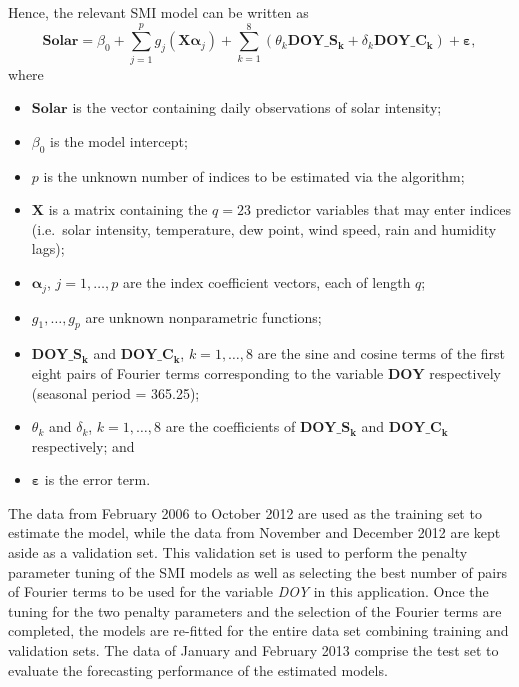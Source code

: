 \documentclass[
  11pt,
  a4paper,
]{article}
\providecommand{\tightlist}{%
  \setlength{\itemsep}{0pt}\setlength{\parskip}{0pt}}\usepackage{longtable,booktabs,array}
\begin{document}
Hence, the relevant SMI model can be written as \[
  \textbf{Solar} = \beta_{0} + \sum_{j = 1}^{p}{g_{j}(\bm{X}\bm{\alpha}_{j})} + \sum_{k = 1}^{8}(\theta_{k}\textbf{DOY}\_\textbf{S}_{\bm{k}} + \delta_{k}\textbf{DOY}\_\textbf{C}_{\bm{k}}) + \bm{\varepsilon},
\] where

\begin{itemize}
\tightlist
\item
  \(\textbf{Solar}\) is the vector containing daily observations of
  solar intensity;
\item
  \(\beta_{0}\) is the model intercept;
\item
  \(p\) is the unknown number of indices to be estimated via the
  algorithm;
\item
  \(\bm{X}\) is a matrix containing the \(q=23\) predictor variables
  that may enter indices (i.e.~solar intensity, temperature, dew point,
  wind speed, rain and humidity lags);
\item
  \(\bm{\alpha}_{j}\), \(j = 1, \dots, p\) are the index coefficient
  vectors, each of length \(q\);
\item
  \(g_{1}, \dots, g_{p}\) are unknown nonparametric functions;
\item
  \(\textbf{DOY}\_\textbf{S}_{\bm{k}}\) and
  \(\textbf{DOY}\_\textbf{C}_{\bm{k}}\), \(k = 1, \dots, 8\) are the
  sine and cosine terms of the first eight pairs of Fourier terms
  corresponding to the variable \(\textbf{DOY}\) respectively (seasonal
  period = 365.25);
\item
  \(\theta_{k}\) and \(\delta_{k}\), \(k = 1, \dots, 8\) are the
  coefficients of \(\textbf{DOY}\_\textbf{S}_{\bm{k}}\) and
  \(\textbf{DOY}\_\textbf{C}_{\bm{k}}\) respectively; and
\item
  \(\bm{\varepsilon}\) is the error term.
\end{itemize}

The data from February 2006 to October 2012 are used as the training set
to estimate the model, while the data from November and December 2012
are kept aside as a validation set. This validation set is used to
perform the penalty parameter tuning of the SMI models as well as
selecting the best number of pairs of Fourier terms to be used for the
variable \emph{DOY} in this application. Once the tuning for the two
penalty parameters and the selection of the Fourier terms are completed,
the models are re-fitted for the entire data set combining training and
validation sets. The data of January and February 2013 comprise the test
set to evaluate the forecasting performance of the estimated models.
\end{document}
